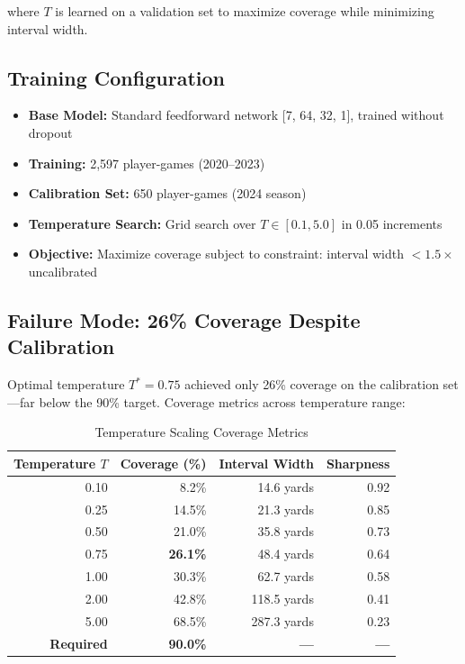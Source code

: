 where $T$ is learned on a validation set to maximize coverage while minimizing interval width.

\subsection{Training Configuration}

\begin{itemize}
  \item \textbf{Base Model:} Standard feedforward network [7, 64, 32, 1], trained without dropout
  \item \textbf{Training:} 2,597 player-games (2020--2023)
  \item \textbf{Calibration Set:} 650 player-games (2024 season)
  \item \textbf{Temperature Search:} Grid search over $T \in [0.1, 5.0]$ in 0.05 increments
  \item \textbf{Objective:} Maximize coverage subject to constraint: interval width $< 1.5 \times$ uncalibrated
\end{itemize}

\subsection{Failure Mode: 26\% Coverage Despite Calibration}

Optimal temperature $T^* = 0.75$ achieved only 26\% coverage on the calibration set—far below the 90\% target. Coverage metrics across temperature range:

\begin{table}[!ht]
\centering
\caption{Temperature Scaling Coverage Metrics}
\label{tab:temp-scaling-coverage}
\begin{tabular}{@{} r r r r @{}}
\toprule
\textbf{Temperature $T$}  & \textbf{Coverage (\%)}  & \textbf{Interval Width}  & \textbf{Sharpness} \\
\midrule
0.10 & 8.2\% & 14.6 yards & 0.92 \\
0.25 & 14.5\% & 21.3 yards & 0.85 \\
0.50 & 21.0\% & 35.8 yards & 0.73 \\
0.75 & \textbf{26.1\%} & 48.4 yards & 0.64 \\
1.00 & 30.3\% & 62.7 yards & 0.58 \\
2.00 & 42.8\% & 118.5 yards & 0.41 \\
5.00 & 68.5\% & 287.3 yards & 0.23 \\
\midrule
\textbf{Required} & \textbf{90.0\%} & \textbf{---} & \textbf{---} \\
\bottomrule
\end{tabular}
\end{table}

